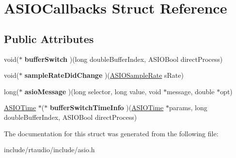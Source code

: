 \hypertarget{struct_a_s_i_o_callbacks}{}\section{A\+S\+I\+O\+Callbacks Struct Reference}
\label{struct_a_s_i_o_callbacks}
\subsection*{Public Attributes}
\begin{DoxyCompactItemize}
\item 
void($\ast$ {\bfseries buffer\+Switch} )(long double\+Buffer\+Index, A\+S\+I\+O\+Bool direct\+Process)\hypertarget{struct_a_s_i_o_callbacks_aee1823ced79d8b99f525e10dd581bf7e}{}\label{struct_a_s_i_o_callbacks_aee1823ced79d8b99f525e10dd581bf7e}

\item 
void($\ast$ {\bfseries sample\+Rate\+Did\+Change} )(\hyperlink{struct_a_s_i_o_sample_rate}{A\+S\+I\+O\+Sample\+Rate} s\+Rate)\hypertarget{struct_a_s_i_o_callbacks_aaced8887f2a7d9796194ad1b3b92ddac}{}\label{struct_a_s_i_o_callbacks_aaced8887f2a7d9796194ad1b3b92ddac}

\item 
long($\ast$ {\bfseries asio\+Message} )(long selector, long value, void $\ast$message, double $\ast$opt)\hypertarget{struct_a_s_i_o_callbacks_a718d69ca73f33a3ee6700c0b20d666e2}{}\label{struct_a_s_i_o_callbacks_a718d69ca73f33a3ee6700c0b20d666e2}

\item 
\hyperlink{struct_a_s_i_o_time}{A\+S\+I\+O\+Time} $\ast$($\ast$ {\bfseries buffer\+Switch\+Time\+Info} )(\hyperlink{struct_a_s_i_o_time}{A\+S\+I\+O\+Time} $\ast$params, long double\+Buffer\+Index, A\+S\+I\+O\+Bool direct\+Process)\hypertarget{struct_a_s_i_o_callbacks_a6cc1664d604c429c5da6df6597ff0910}{}\label{struct_a_s_i_o_callbacks_a6cc1664d604c429c5da6df6597ff0910}

\end{DoxyCompactItemize}


The documentation for this struct was generated from the following file\+:\begin{DoxyCompactItemize}
\item 
include/rtaudio/include/asio.\+h\end{DoxyCompactItemize}
